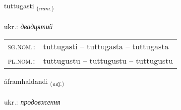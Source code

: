 \documentclass[frontgrid, backgrid]{flacards}\usepackage[]{graphicx}\usepackage[]{xcolor}
\begin{document}
\renewcommand{\flhead}{\vskip5pt \fboxsep=0pt {\small\bfseries\footnotesize Töluorð | чисельник}}
\renewcommand{\fcfoot}{\vskip5pt \fboxsep=0pt \hspace{2pt}{\small\bfseries\footnotesize 3K}}

\renewcommand{\blhead}{\vskip5pt {\small\bfseries\footnotesize Töluorð | чисельник }}
\renewcommand{\bcfoot}{\vskip5pt \hspace{2pt}{\small\bfseries\footnotesize 3K}}


{tuttugasti \small{\textsubscript{(\textit{num.})}} \\[1ex] %
\textphonetic{[tʰʏhtʏɣastɪ]} \\
ukr.: \emph{двадцятий} \\  [2ex]
\renewcommand*{\arraystretch}{0.8}
\begin{tabular}{ll}
\textsc{sg.nom.}: & tuttugasti  --  tuttugasta -- tuttugasta \\ 
\textsc{pl.nom.}: & tuttugustu -- tuttugustu -- tuttugustu
\end{tabular}
}

\renewcommand{\flhead}{\vskip5pt \fboxsep=0pt {\small\bfseries\footnotesize Lýsingarorð | прикметник}}
\renewcommand{\fcfoot}{\vskip5pt \fboxsep=0pt \hspace{2pt}{\small\bfseries\footnotesize 3K}}

\renewcommand{\blhead}{\vskip5pt {\small\bfseries\footnotesize Lýsingarorð | прикметник }}
\renewcommand{\bcfoot}{\vskip5pt \hspace{2pt}{\small\bfseries\footnotesize 3K}}


{áframhaldandi \small{\textsubscript{(\textit{adj.})}} \\[1ex] %
\textphonetic{[auːframhaltantɪ]} \\
ukr.: \emph{продовження} \\  [2ex]
\renewcommand*{\arraystretch}{0.8}
}
\end{document}

